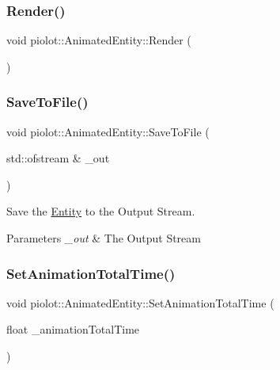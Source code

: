 \subsubsection{\texorpdfstring{Render()}{Render()}}
{\footnotesize\ttfamily void piolot\+::\+Animated\+Entity\+::\+Render (\begin{DoxyParamCaption}{ }\end{DoxyParamCaption})}

\mbox{\label{classpiolot_1_1_animated_entity_af3d37876b5baa074f3298a3448191a67}} 
\subsubsection{\texorpdfstring{Save\+To\+File()}{SaveToFile()}}
{\footnotesize\ttfamily void piolot\+::\+Animated\+Entity\+::\+Save\+To\+File (\begin{DoxyParamCaption}\item[{std\+::ofstream \&}]{\+\_\+out }\end{DoxyParamCaption})}



Save the \mbox{\hyperlink{classpiolot_1_1_entity}{Entity}} to the Output Stream. 


\begin{DoxyParams}{Parameters}
{\em \+\_\+out} & The Output Stream \\
\hline
\end{DoxyParams}
\mbox{\label{classpiolot_1_1_animated_entity_ada8db1e8e54e8fc3bef18529ca63b68b}} 
\subsubsection{\texorpdfstring{Set\+Animation\+Total\+Time()}{SetAnimationTotalTime()}}
{\footnotesize\ttfamily void piolot\+::\+Animated\+Entity\+::\+Set\+Animation\+Total\+Time (\begin{DoxyParamCaption}\item[{float}]{\+\_\+animation\+Total\+Time }\end{DoxyParamCaption})\hspace{0.3cm}{\ttfamily [inline]}}

